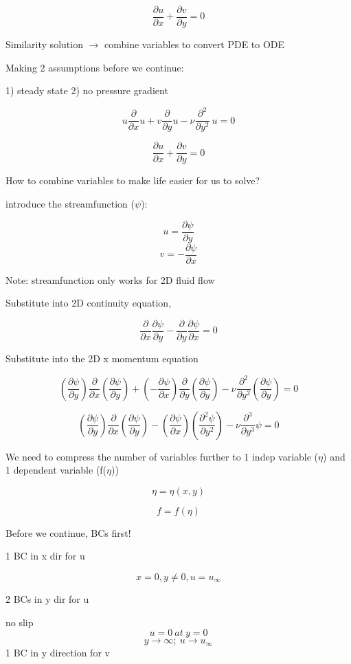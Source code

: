 \documentclass[11pt]{article}
\begin{document}
$$\frac{\partial u}{\partial x} + \frac{\partial v}{\partial y} = 0$$

Similarity solution $\rightarrow$ combine variables to convert PDE to ODE

Making 2 assumptions before we continue:

1) steady state
2) no pressure gradient

$$ u  \frac{\partial}{\partial x } u + v  \frac{\partial}{\partial y} u -  \nu  \frac{\partial^2}{\partial y^2} \ u  =  0$$

$$\frac{\partial u}{\partial x} + \frac{\partial v}{\partial y} = 0$$

How to combine variables to make life easier for us to solve?

introduce the streamfunction ($\psi$):

$$u = \frac{\partial \psi}{\partial y}$$
$$v = -\frac{\partial \psi}{\partial x}$$

Note: streamfunction only works for 2D fluid flow

Substitute into 2D continuity equation,

$$\frac{\partial}{\partial x} \frac{\partial \psi}{\partial y} - \frac{\partial}{\partial y}  \frac{\partial \psi}{\partial x}= 0$$

Substitute into the 2D x momentum equation

$$ (\frac{\partial \psi}{\partial y})  \frac{\partial}{\partial x } (\frac{\partial \psi}{\partial y}) + (-\frac{\partial \psi}{\partial x})  \frac{\partial}{\partial y} (\frac{\partial \psi}{\partial y}) -  \nu  \frac{\partial^2}{\partial y^2} (\frac{\partial \psi}{\partial y})  =  0$$


$$ (\frac{\partial \psi}{\partial y})  \frac{\partial}{\partial x } (\frac{\partial \psi}{\partial y}) - (\frac{\partial \psi}{\partial x})  (\frac{\partial^2 \psi}{\partial y^2}) -  \nu  \frac{\partial^3}{\partial y^3} \psi  =  0$$

We need to compress the number of variables further to 1 indep variable ($\eta$) and 1 dependent variable (f($\eta$))

$$\eta= \eta(x,y)$$

$$f= f(\eta)$$

Before we continue, BCs first!

1 BC in x dir for u

$$x=0 , y\neq 0, u=u_\infty$$

2 BCs in y dir for u 

no slip
$$u=0 \ at \ y=0$$
$$y \rightarrow \infty;\ u \rightarrow u_\infty$$
1 BC in y direction for v
\end{document}
